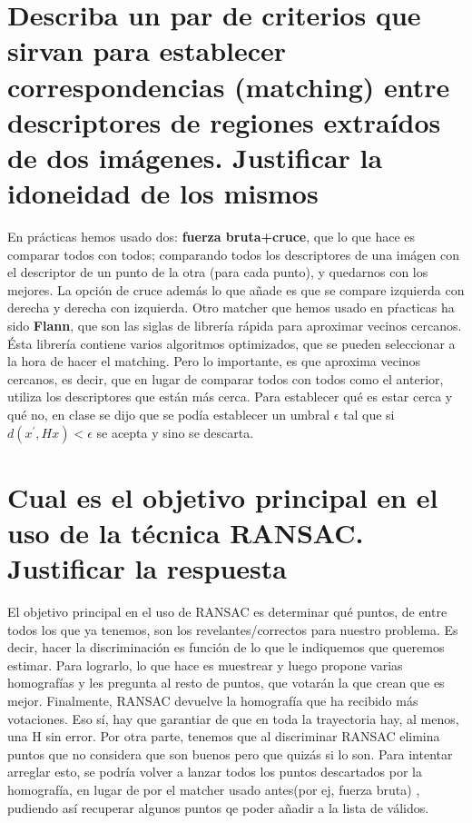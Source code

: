 \section{Describa un par de criterios que sirvan para establecer correspondencias
(matching) entre descriptores de regiones extraídos de dos imágenes. Justificar
la idoneidad de los mismos}
En prácticas hemos usado dos: \textbf{fuerza bruta+cruce}, que lo que hace es comparar todos con todos; comparando todos los descriptores
de una imágen con el descriptor de un punto de la otra (para cada punto), y quedarnos con los mejores. La opción de cruce además lo que añade
es que se compare izquierda con derecha y derecha con izquierda.
\newline
Otro matcher que hemos usado en pŕacticas ha sido \textbf{Flann}, que son las siglas de librería rápida para aproximar vecinos cercanos.\newline
Ésta librería contiene varios algoritmos optimizados, que se pueden seleccionar a la hora de hacer el matching. Pero lo importante,
es que aproxima vecinos cercanos, es decir, que en lugar de comparar todos con todos como el anterior, utiliza los descriptores que
están más cerca. Para establecer qué es estar cerca y qué no, en clase se dijo que se podía establecer un umbral $\epsilon$ tal que si
$d(x^{'},Hx)< \epsilon $ se acepta y sino se descarta. \newline

\section{Cual es el objetivo principal en el uso de la técnica RANSAC. Justificar
la respuesta}
El objetivo principal en el uso de RANSAC es determinar qué puntos, de entre todos los que ya tenemos, son
los revelantes/correctos para nuestro problema. Es decir, hacer la discriminación es función de lo que le indiquemos que
queremos estimar. \newline
Para lograrlo, lo que hace es muestrear y luego propone varias homografías y les pregunta al resto de puntos, que
votarán la que crean que es mejor. Finalmente, RANSAC devuelve la homografía que ha recibido más votaciones. \newline
Eso sí, hay que garantiar de que en toda la trayectoria hay, al menos, una H sin error. \newline
Por otra parte, tenemos que al discriminar RANSAC elimina puntos que no considera que son buenos pero que quizás si lo son.
Para intentar arreglar esto, se podría volver a lanzar todos los puntos descartados por la homografía, en lugar de por el matcher
usado antes(por ej, fuerza bruta) , pudiendo así recuperar algunos puntos qe poder añadir a la lista de válidos.
